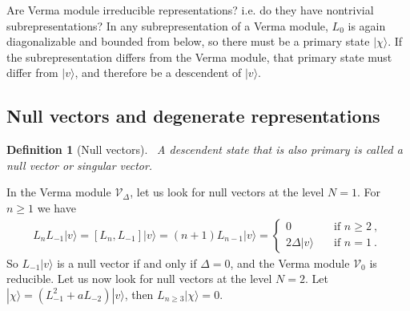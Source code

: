 \documentclass[12pt, a4paper]{article}
\theoremstyle{break}
\newtheorem{defn}[exo]{Definition}
\begin{document}
Are Verma module irreducible representations? i.e. do they have nontrivial subrepresentations? In any subrepresentation of a Verma module, $L_0$ is again diagonalizable and bounded from below, so there must be a primary state $|\chi\rangle$. If the subrepresentation differs from the Verma module, that primary state must differ from $|v\rangle$, and therefore be a descendent of $|v\rangle$.

\subsection{Null vectors and degenerate representations}\label{sec:nv}

\begin{defn}[Null vectors]
 ~\label{def:nv}
 A descendent state that is also primary is called a null vector or singular vector.
\end{defn}
In the Verma module $\mathcal V_\Delta$, let us look for null vectors at the level $N=1$. For $n\geq 1$ we have 
\begin{align}
L_n L_{-1}|v\rangle = [L_n, L_{-1}] |v\rangle = (n+1) L_{n-1}|v\rangle = 
\left\{\begin{array}{ll} 0 &  \quad \text{if } n\geq 2\ , \\ 2\Delta |v\rangle & \quad \text{if } n = 1\ . \end{array}\right. 
\end{align}
So $L_{-1}|v\rangle$ is a null vector if and only if $\Delta=0$, and the Verma module $\mathcal V_0$ is reducible.
Let us now look for null vectors at the level $N=2$. Let $|\chi\rangle = (L_{-1}^2 + a L_{-2})|v\rangle$, then $L_{n\geq 3} |\chi \rangle =0$. 
\end{document}
